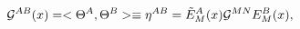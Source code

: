 \begin{equation}\label{GAB}
 {\cal G}^{AB}(x) = < \Theta^A , \Theta^B > \equiv  \eta^{AB} =
 {\tilde E}^A_M(x) {\cal G}^{MN} E^B_M(x),
\end{equation}

